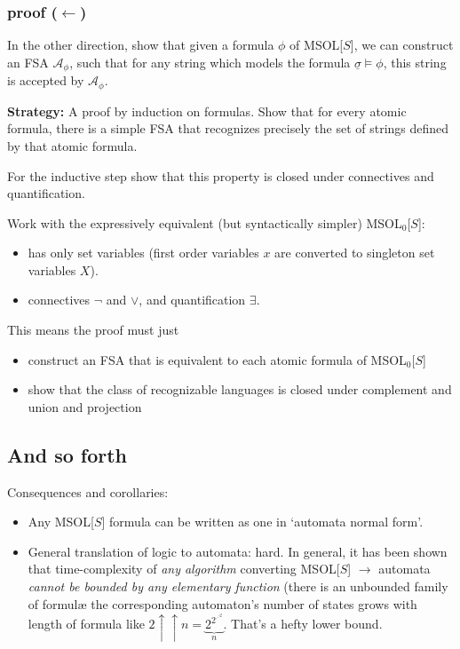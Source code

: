 \documentclass{beamer}
\begin{document}
\subsubsection{proof ($\leftarrow$)}
\begin{frame}
In the other direction, show that given a formula $\phi$ of MSOL[$S$], we can construct an FSA $\mathcal{A}_\phi$, such that for any string which models the formula $\underline{\sigma}\models\phi$, this string is accepted by $\mathcal{A}_\phi$.

\pause

\textbf{Strategy:} A proof by induction on formulas. Show that for every atomic formula, there is a simple FSA that recognizes precisely the set of strings defined by that atomic formula.  

For the inductive step show that this property is closed under connectives and quantification.

\end{frame}

\begin{frame}
Work with the expressively equivalent (but syntactically simpler) MSOL$_0$[$S$]:
\begin{itemize}
\item 
has only set variables (first order variables $x$ are converted to singleton set variables $X$). 
\item 
connectives $\lnot$ and $\lor$, and quantification $\exists$. 
\end{itemize}

This means the proof must just
\begin{itemize}
\item construct an FSA that is equivalent to each atomic formula of MSOL$_0$[$S$]
\item show that the class of recognizable languages is closed under complement and union and projection
\end{itemize}
\end{frame}

\subsection{And so forth}
\begin{frame}
Consequences and corollaries:
\begin{itemize}
\item Any MSOL[$S$] formula can be written as one in `automata normal form'.
\pause 
\item General translation of logic to automata: hard.  \pause In general, it has been shown that time-complexity of \emph{any algorithm} converting MSOL[$S$] $\to$ automata \emph{cannot be bounded by any elementary function} (there is an unbounded family of formulæ the corresponding automaton's number of states grows with length of formula like $2\uparrow\uparrow n = \underbrace{2^{2^{\iddots^{2}}}}_{n}$. That's a hefty lower bound.
\end{itemize}
\end{frame}
\end{document}
